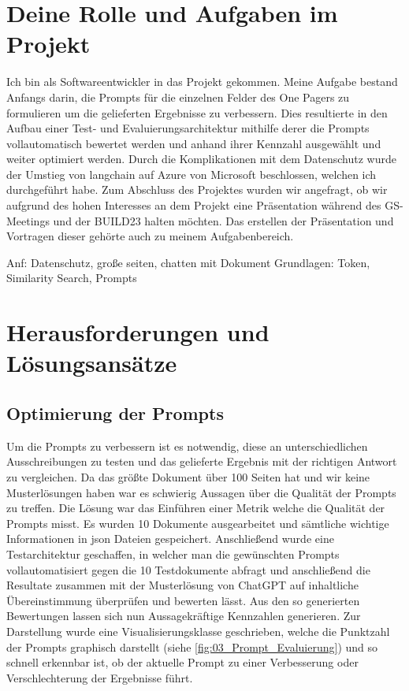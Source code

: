 \section{Deine Rolle und Aufgaben im Projekt}
Ich bin als Softwareentwickler in das Projekt gekommen. Meine Aufgabe bestand Anfangs darin, die Prompts für die einzelnen 
Felder des One Pagers zu formulieren um die gelieferten Ergebnisse zu verbessern. Dies resultierte in den Aufbau einer 
Test- und Evaluierungsarchitektur mithilfe derer die Prompts vollautomatisch bewertet werden und anhand ihrer Kennzahl 
ausgewählt und weiter optimiert werden. Durch die Komplikationen mit dem Datenschutz wurde der Umstieg von langchain auf 
Azure von Microsoft beschlossen, welchen ich durchgeführt habe. Zum Abschluss des Projektes wurden wir angefragt, ob wir 
aufgrund des hohen Interesses an dem Projekt eine Präsentation während des GS-Meetings und der BUILD23 halten möchten. 
Das erstellen der Präsentation und Vortragen dieser gehörte auch zu meinem Aufgabenbereich.

Anf: Datenschutz, große seiten, chatten mit Dokument
Grundlagen: Token, Similarity Search, Prompts

\section{Herausforderungen und Lösungsansätze}

\subsection{Optimierung der Prompts}
Um die Prompts zu verbessern ist es notwendig, diese an unterschiedlichen Ausschreibungen zu testen und das gelieferte 
Ergebnis mit der richtigen Antwort zu vergleichen. Da das größte Dokument über 100 Seiten hat und wir keine Musterlösungen 
haben war es schwierig Aussagen über die Qualität der Prompts zu treffen. Die Lösung war das Einführen einer Metrik welche 
die Qualität der Prompts misst. Es wurden 10 Dokumente ausgearbeitet und sämtliche wichtige Informationen in json Dateien 
gespeichert. Anschließend wurde eine Testarchitektur geschaffen, in welcher man die gewünschten Prompts vollautomatisiert 
gegen die 10 Testdokumente abfragt und anschließend die Resultate zusammen mit der Musterlösung von ChatGPT auf inhaltliche 
Übereinstimmung überprüfen und bewerten lässt. Aus den so generierten Bewertungen lassen sich nun Aussagekräftige Kennzahlen 
generieren. Zur Darstellung wurde eine Visualisierungsklasse geschrieben, welche die Punktzahl der Prompts graphisch darstellt 
(siehe \ref{fig:03_Prompt_Evaluierung}) und so schnell erkennbar ist, ob der aktuelle Prompt zu einer Verbesserung 
oder Verschlechterung der Ergebnisse führt.

